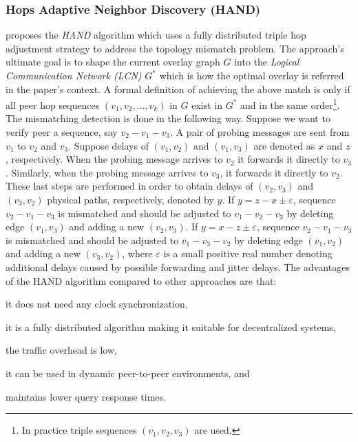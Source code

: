 \subsubsection{Hops Adaptive Neighbor Discovery (HAND)}
\cite{CLZHC2006} proposes the \emph{HAND} algorithm which uses a
fully distributed triple hop adjustment strategy to address the topology
mismatch problem. The approach's ultimate goal is to shape the current overlay
graph $G$ into the \emph{Logical Communication Network (LCN)} $G^{*}$ which is
how the optimal overlay is referred in the paper's context. A formal
definition of achieving the above match is only if all peer hop sequences $(v_1,
v_2, \ldots, v_k)$ in $G$ exist in $G^{*}$ and in the same order\footnote{In
practice triple sequences $(v_1, v_2, v_3)$ are used.}. The mismatching
detection is done in the following way. Suppose we want to verify peer a
sequence, say $v_2-v_1-v_3$. A pair of probing messages are sent from $v_1$ to
$v_2$ and $v_3$. Suppose delays of $(v_1,v_2)$ and $(v_1,v_3)$ are denoted as
$x$ and $z$, respectively. When the probing message arrives to $v_2$ it forwards
it directly to $v_3$. Similarly, when the probing message arrives to $v_3$, it
forwards it directly to $v_2$. These last steps are performed in order to obtain
delays of $(v_2,v_3)$ and $(v_3,v_2)$ physical paths, respectively, denoted by
$y$. If $y=z-x\pm\varepsilon$, sequence $v_2-v_1-v_3$ is mismatched and should
be adjusted to $v_1-v_2-v_3$ by deleting edge $(v_1,v_3)$ and adding a new
$(v_2,v_3)$. If $y=x-z\pm\varepsilon$, sequence $v_2-v_1-v_3$ is mismatched and
should be adjusted to $v_1-v_3-v_2$ by deleting edge $(v_1,v_2)$ and adding a
new $(v_3,v_2)$, where $\varepsilon$ is a small positive real number denoting
additional delays caused by possible forwarding and jitter delays. The
advantages of the HAND algorithm compared to other approaches are that:
\begin{inparaenum}
  \item it does not need any clock synchronization,
  \item it is a fully distributed algorithm making it suitable for
        decentralized systems,
  \item the traffic overhead is low,
  \item it can be used in dynamic peer-to-peer environments, and
  \item maintains lower query response times.
\end{inparaenum}

%
%

